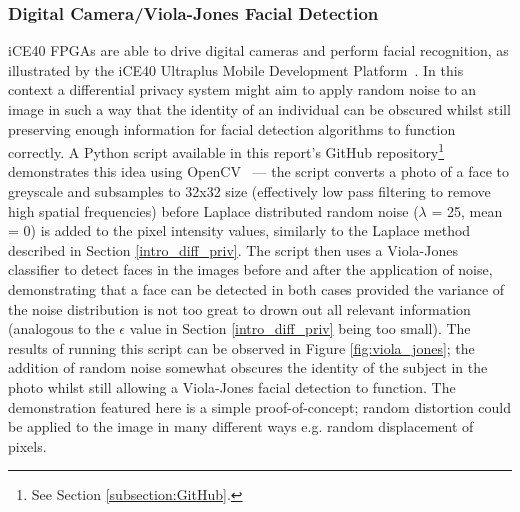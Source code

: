 \documentclass[12pt]{article}
\begin{document}
    \subsubsection{Digital Camera/Viola-Jones Facial Detection}
      iCE40 FPGAs are able to drive digital cameras and perform facial recognition, as illustrated by the iCE40 Ultraplus Mobile Development Platform~\cite{iCE40_MDP}. In this context a differential privacy system might aim to apply random noise to an image in such a way that the identity of an individual can be obscured whilst still preserving enough information for facial detection algorithms to function correctly.  A Python script available in this report's GitHub repository\footnote{See Section \ref{subsection:GitHub}.} demonstrates this idea using OpenCV~\cite{opencv-contrib-python} --- the script converts a photo of a face to greyscale and subsamples to 32x32 size (effectively low pass filtering to remove high spatial frequencies) before Laplace distributed random noise ($\lambda$ = 25, mean = 0) is added to the pixel intensity values, similarly to the Laplace method described in Section \ref{intro_diff_priv}. The script then uses a Viola-Jones~\cite{Viola01rapidobject} classifier to detect faces in the images before and after the application of noise, demonstrating that a face can be detected in both cases provided the variance of the noise distribution is not too great to drown out all relevant information (analogous to the $\epsilon$ value in Section \ref{intro_diff_priv} being too small). The results of running this script can be observed in Figure \ref{fig:viola_jones}; the addition of random noise somewhat obscures the identity of the subject in the photo whilst still allowing a Viola-Jones facial detection to function. The demonstration featured here is a simple proof-of-concept; random distortion could be applied to the image in many different ways e.g. random displacement of pixels.
\end{document}
